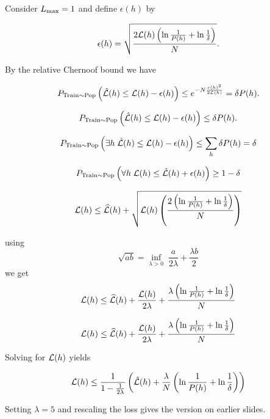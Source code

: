 {

Consider $L_{\max} = 1$ and define $\epsilon(h)$ by

\vfill
$$\epsilon(h) = \sqrt{\frac{2{\cal L}(h)\left(\ln\frac{1}{P(h)} + \ln\frac{1}{\delta}\right)}{N}}.$$

\vfill
By the relative Chernoof bound we have

\vfill
$$P_{\mathrm{Train} \sim \mathrm{Pop}}\left(\hat{{\cal L}}(h) \leq {\cal L}(h) - \epsilon(h)\right) \leq e^{-N\frac{\epsilon(h)^2}{2{\cal L}(h)}} = \delta P(h).$$


$$P_{\mathrm{Train} \sim \mathrm{Pop}}\left(\hat{{\cal L}}(h) \leq {\cal L}(h) - \epsilon(h)\right) \leq \delta P(h).$$

\vfill
$$P_{\mathrm{Train} \sim \mathrm{Pop}}\left(\exists h\;\hat{{\cal L}}(h) \leq {\cal L}(h) - \epsilon(h)\right) \leq \sum_h \delta P(h) =\delta$$

\vfill
$$P_{\mathrm{Train} \sim \mathrm{Pop}}\left(\forall h\;{\cal L}(h) \leq \hat{{\cal L}}(h) + \epsilon(h)\right) \geq 1- \delta$$


$${\cal L}(h) \leq \widehat{{\cal L}}(h) + \sqrt{{\cal L}(h)\left(\frac{2\left(\ln\frac{1}{P(h)} + \ln\frac{1}{\delta}\right)}{N}\right)}$$

using
$$\sqrt{ab} = \inf_{\lambda > 0}\;\frac{a}{2\lambda} + \frac{\lambda b}{2}$$
\vfill
we get
$${\cal L}(h) \leq \widehat{{\cal L}}(h) + \frac{{\cal L}(h)}{2\lambda} + \frac{\lambda\left(\ln\frac{1}{P(h)} + \ln\frac{1}{\delta}\right)}{N}$$

$${\cal L}(h) \leq \widehat{{\cal L}}(h) + \frac{{\cal L}(h)}{2\lambda} + \frac{\lambda\left(\ln\frac{1}{P(h)} + \ln\frac{1}{\delta}\right)}{N}$$

\vfill
Solving for ${\cal L}(h)$ yields

\vfill
$${\cal L}(h) \leq \frac{1}{1-\frac{1}{2\lambda}}\left(\hat{{\cal L}}(h) + \frac{\lambda}{N}\left(\ln \frac{1}{P(h)} + \ln \frac{1}{\delta}\right)\right)$$

\vfill
Setting $\lambda = 5$ and rescaling the loss gives the version on earlier slides.

}
